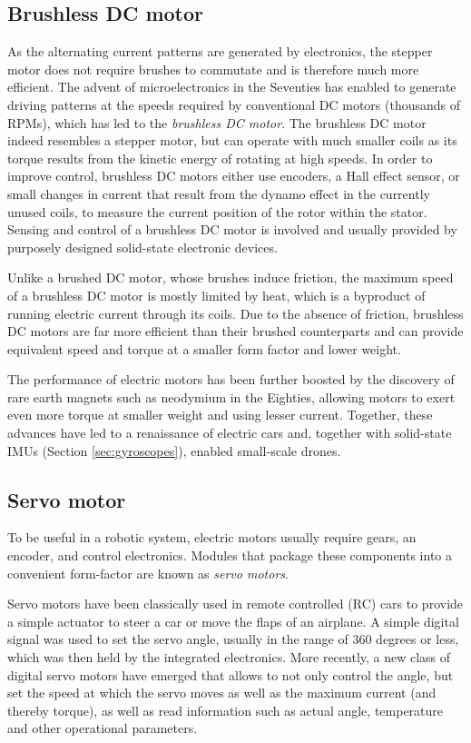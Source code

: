 \subsection{Brushless DC motor}\label{sec:brushlessDC}
As the alternating current patterns are generated by electronics, the stepper motor does not require brushes to commutate and is therefore much more efficient. The advent of microelectronics in the Seventies has enabled to generate driving patterns at the speeds required by conventional DC motors (thousands of RPMs), which has led to the \textsl{brushless DC motor}. The brushless DC motor indeed resembles a stepper motor, but can operate with much smaller coils as its torque results from the kinetic energy of rotating at high speeds. In order to improve control, brushless DC motors either use encoders, a Hall effect sensor, or small changes in current that result from the dynamo effect in the currently unused coils, to measure the current position of the rotor within the stator. Sensing and control of a brushless DC motor is involved and usually provided by purposely designed solid-state electronic devices.

Unlike a brushed DC motor, whose brushes induce friction, the maximum speed of a brushless DC motor is mostly limited by heat, which is a byproduct of running electric current through its coils. Due to the absence of friction, brushless DC motors are far more efficient than their brushed counterparts and can provide equivalent speed and torque at a smaller form factor and lower weight.

The performance of electric motors has been further boosted by the discovery of rare earth magnets such as neodymium in the Eighties, allowing motors to exert even more torque at smaller weight and using lesser current. Together, these advances have led to a renaissance of electric cars and, together with solid-state IMUs (Section \ref{sec:gyroscopes}), enabled small-scale drones.

\subsection{Servo motor}

To be useful in a robotic system, electric motors usually require gears, an encoder, and control electronics. Modules that package these components into a convenient form-factor are known as \textsl{servo motors}.

Servo motors have been classically used in remote controlled (RC) cars to provide a simple actuator to steer a car or move the flaps of an airplane. A simple digital signal was used to set the servo angle, usually in the range of 360 degrees or less, which was then held by the integrated electronics. More recently, a new class of digital servo motors have emerged that allows to not only control the angle, but set the speed at which the servo moves as well as the maximum current (and thereby torque), as well as read information such as actual angle, temperature and other operational parameters.


